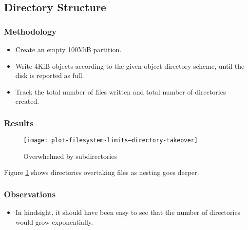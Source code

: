 \documentclass[12pt,a4paper,two-side]{book}
\begin{document}
\subsection{Directory Structure}

\subsubsection{Methodology}

\begin{itemize}

  \item Create an empty 100MiB partition.

  \item Write 4KiB objects according to the given object directory scheme, until
    the disk is reported as full.

  \item Track the total number of files written and total number of directories
    created.

\end{itemize}

\subsubsection{Results}

\begin{figure}[p]
  \caption{Overwhelmed by subdirectories}
  \label{fig:plot-filesystem-limits--directory-takeover}
  \centering
    \texttt{[image: plot-filesystem-limits--directory-takeover]}
\end{figure}

Figure \ref{fig:plot-filesystem-limits--directory-takeover} shows directories
overtaking files as nesting goes deeper.

\subsubsection{Observations}

\begin{itemize}

  \item In hindsight, it should have been easy to see that the number of
    directories would grow exponentially.

\end{itemize}
\end{document}
